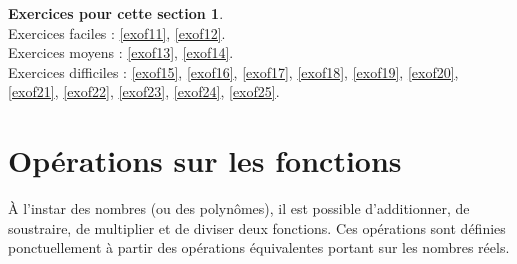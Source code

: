 \documentclass[a4paper,13pt]{scrreprt}
\theoremstyle{plain}
\theoremstyle{definition}
\newtheorem*{epcs}{Exercices pour cette section}
\begin{document}
\begin{epcs}
	~~\\
	Exercices faciles : \ref{exof11}, \ref{exof12}.\\
	Exercices moyens : \ref{exof13}, \ref{exof14}. \\
	Exercices difficiles : \ref{exof15}, \ref{exof16}, \ref{exof17}, \ref{exof18}, \ref{exof19}, \ref{exof20}, \ref{exof21}, \ref{exof22}, \ref{exof23}, \ref{exof24}, \ref{exof25}.
\end{epcs}

\section{Opérations sur les fonctions}

À l'instar des nombres (ou des polynômes), il est possible d'additionner, de soustraire, de multiplier et de diviser deux fonctions. Ces opérations sont définies ponctuellement à partir des opérations équivalentes portant sur les nombres réels.
\end{document}
